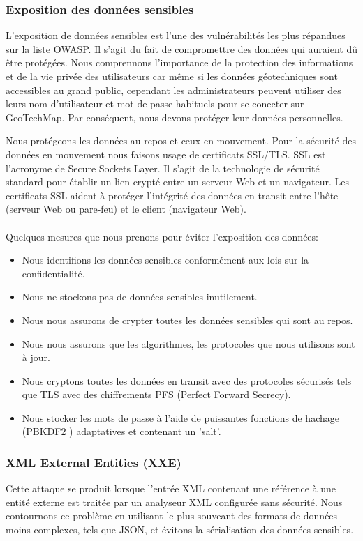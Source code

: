     \subsubsection{Exposition des données sensibles}
        L'exposition de données sensibles est l'une des vulnérabilités les plus répandues sur la liste OWASP. 
        Il s'agit du fait de compromettre des données qui auraient dû être protégées.
        Nous comprennons l’importance de la protection des informations et de 
        la vie privée des utilisateurs car même si les données géotechniques sont accessibles au grand public,
        cependant les administrateurs peuvent utiliser des leurs nom d'utilisateur et mot de passe habituels pour se
        conecter sur GeoTechMap. Par conséquent, nous devons protéger leur données personnelles. 
        \par 
        Nous protégeons les données au repos et ceux en mouvement. Pour la sécurité des données en mouvement
        nous faisons usage de certificats SSL/TLS.
        SSL est l'acronyme de Secure Sockets Layer. Il s'agit de la technologie de sécurité standard pour 
        établir un lien crypté entre un serveur Web et un navigateur. Les certificats SSL aident à 
        protéger l'intégrité des données en transit entre l'hôte (serveur Web ou pare-feu) et le client 
        (navigateur Web).
        \paragraph{}
        Quelques mesures que nous prenons pour éviter l'exposition des données:
        \begin{itemize}
            \item Nous identifions les données sensibles conformément aux lois sur la confidentialité.
            \item Nous ne stockons pas de données sensibles inutilement.
            \item Nous nous assurons de crypter toutes les données sensibles qui sont au repos.
            \item Nous nous assurons que les algorithmes, les protocoles que nous utilisons sont à 
            jour.
            \item Nous cryptons toutes les données en transit avec des protocoles sécurisés tels que 
            TLS avec des chiffrements PFS (Perfect Forward Secrecy).
            \item Nous stocker les mots de passe à l'aide de puissantes fonctions de hachage (PBKDF2 \cite{keycloakdoc}) adaptatives et 
            contenant un 'salt'.
        \end{itemize}

    \subsubsection{XML External Entities (XXE)}   
    Cette attaque se produit lorsque l'entrée XML contenant une référence à une entité externe est 
    traitée par un analyseur XML configurée sans sécurité. 
    Nous contournons ce problème en utilisant le plus souveant des formats de données moins complexes, tels que JSON, 
    et évitons la sérialisation des données sensibles.


